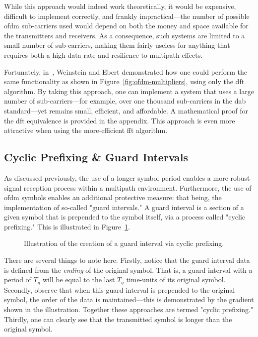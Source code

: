 \documentclass[class=report,11pt,crop=false]{standalone}
\begin{document}
While this approach would indeed work theoretically, it would be expensive, difficult to implement correctly, and frankly impractical---the number of possible \gls{ofdm} sub-carriers used would depend on both the money and space available for the transmitters and receivers. As a consequence, such systems are limited to a small number of sub-carriers, making them fairly useless for anything that requires both a high data-rate and resilience to multipath effects.

Fortunately, in~\cite{Weinstein1971}, Weinstein and Ebert demonstrated how one could perform the same functionality as shown in Figure~\ref{fig:ofdm-multipliers}, using only the \gls{dft} algorithm. By taking this approach, one can implement a system that uses a large number of sub-carriers---for example, over one thousand sub-carriers in the \gls{dab} standard---yet remains small, efficient, and affordable. A mathematical proof for the \gls{dft} equivalence is provided in the appendix. This approach is even more attractive when using the more-efficient \gls{fft} algorithm.

\subsection{Cyclic Prefixing \& Guard Intervals}
As discussed previously, the use of a longer symbol period enables a more robust signal reception process within a multipath environment. Furthermore, the use of \gls{ofdm} symbols enables an additional protective measure: that being, the implementation of so-called "guard intervals." A guard interval is a section of a given symbol that is prepended to the symbol itself, via a process called "cyclic prefixing." This is illustrated in Figure~\ref{fig:cyclic-prefix}.

\begin{figure}[htbp]
    \centering
    \captionsetup{type=figure}
    \def\svgwidth{0.7\linewidth}
    { %
        }
    \caption{Illustration of the creation of a guard interval via cyclic prefixing.}
    \label{fig:cyclic-prefix}
\end{figure}

There are several things to note here. Firstly, notice that the guard interval data is defined from the \emph{ending} of the original symbol. That is, a guard interval with a period of \(T_g\) will be equal to the last \(T_g\) time-units of its original symbol. Secondly, observe that when this guard interval is prepended to the original symbol, the order of the data is maintained---this is demonstrated by the gradient shown in the illustration. Together these approaches are termed "cyclic prefixing." Thirdly, one can clearly see that the transmitted symbol is longer than the original symbol.
\end{document}
